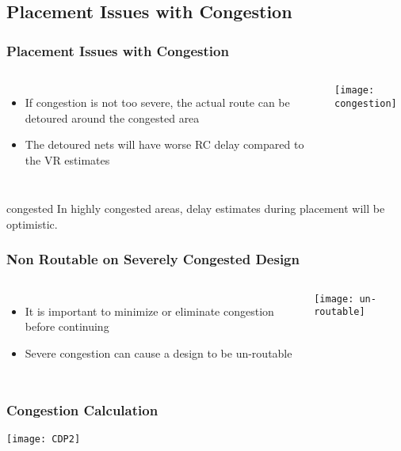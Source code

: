 \documentclass[compress]{beamer}
\begin{document}
\subsection[Issues]{Placement Issues with Congestion}
\begin{frame}
	\frametitle{Placement Issues with Congestion}
	\begin{columns}
			\begin{itemize}
				\item If congestion is not too severe, the actual route can be detoured around the congested area
				\item The detoured nets will have worse RC delay compared to the VR estimates
			\end{itemize}
			\begin{center}
				\texttt{[image: congestion]}
			\end{center}
	\end{columns}
	\begin{alertblock}{congested}
	In highly congested areas, delay estimates during placement will be optimistic.
\end{alertblock}
\end{frame}

\begin{frame}
	\frametitle{Non Routable on Severely Congested Design}
		\begin{columns}
		\column{0.6 \textwidth}
		\begin{itemize}
			\item It is important to minimize or eliminate congestion before continuing
			
			\item Severe congestion can cause a design to be un-routable
			
		\end{itemize}
		\column{0.5 \textwidth}
		\begin{center}
			\texttt{[image: un-routable]}
		\end{center}
	\end{columns}
\end{frame}

\begin{frame}
	\frametitle{Congestion Calculation}
	\begin{center}
		\texttt{[image: CDP2]}
	\end{center}
\end{frame}
\end{document}
